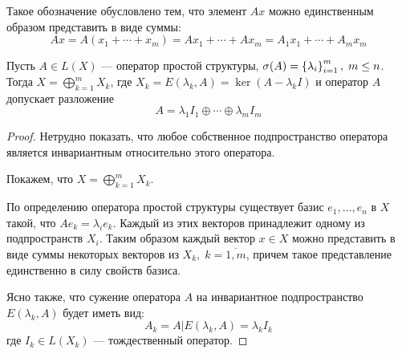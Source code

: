 Такое обозначение обусловлено тем, что элемент $Ax$ можно единственным образом
представить в виде суммы:
\[ Ax = A(x_1 + \dotsb + x_m) = Ax_1 + \dotsb + Ax_m = A_1 x_1 + \dotsb + A_m
    x_m \]

\begin{theorem} \label{th:diagonexpansion}
    Пусть $A \in L(X)$ — оператор простой структуры, $\operatorname{\sigma}(A) = \left\{\lambda_i\right\}_{i=1}^m, \; 
    m \le n$. Тогда $X = \bigoplus\limits_{k=1}^m X_k$, где $X_k =
    E(\lambda_k, A) = \ker (A-\lambda_k I)$ и оператор $A$ допускает разложение
    \[ A = \lambda_1 I_1 \oplus \dotsb \oplus \lambda_m I_m \]
\end{theorem}

\begin{proof}
    Нетрудно показать, что любое собственное подпространство оператора является
    инвариантным относительно этого оператора. 
    
    Покажем, что $ X = \bigoplus\limits_{k=1}^m X_k$. 
    
    По определению оператора простой структуры
    существует базис $e_1, \dotsc, e_n$ в $X$ такой, что $Ae_k = \lambda_{i}
    e_k$. Каждый из этих векторов принадлежит одному из подпространств $X_i$.
    Таким образом каждый вектор $x\in X$ можно представить в виде суммы
    некоторых векторов из $X_k,\; k = \overline{1,m}$, причем такое
    представление единственно в силу свойств базиса.

    Ясно также, что сужение оператора $A$ на инвариантное подпространство
    $E(\lambda_k, A)$ будет иметь вид:
    \[ A_k = A | E(\lambda_k, A) = \lambda_k I_k \]
    где $I_k \in L(X_k)$ — тождественный оператор.
\end{proof}

